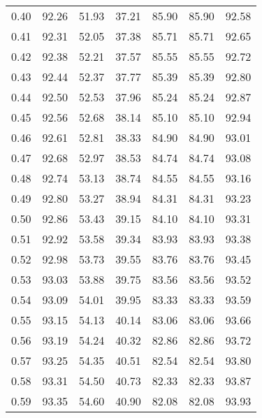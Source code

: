 \begin{tabular}{|c|c|c|c|c|c|c|}
      0.40 &     92.26 &     51.93 &      37.21 &   85.90 &      85.90 &         92.58 \\
      0.41 &     92.31 &     52.05 &      37.38 &   85.71 &      85.71 &         92.65 \\
      0.42 &     92.38 &     52.21 &      37.57 &   85.55 &      85.55 &         92.72 \\
      0.43 &     92.44 &     52.37 &      37.77 &   85.39 &      85.39 &         92.80 \\
      0.44 &     92.50 &     52.53 &      37.96 &   85.24 &      85.24 &         92.87 \\
      0.45 &     92.56 &     52.68 &      38.14 &   85.10 &      85.10 &         92.94 \\
      0.46 &     92.61 &     52.81 &      38.33 &   84.90 &      84.90 &         93.01 \\
      0.47 &     92.68 &     52.97 &      38.53 &   84.74 &      84.74 &         93.08 \\
      0.48 &     92.74 &     53.13 &      38.74 &   84.55 &      84.55 &         93.16 \\
      0.49 &     92.80 &     53.27 &      38.94 &   84.31 &      84.31 &         93.23 \\
      0.50 &     92.86 &     53.43 &      39.15 &   84.10 &      84.10 &         93.31 \\
      0.51 &     92.92 &     53.58 &      39.34 &   83.93 &      83.93 &         93.38 \\
      0.52 &     92.98 &     53.73 &      39.55 &   83.76 &      83.76 &         93.45 \\
      0.53 &     93.03 &     53.88 &      39.75 &   83.56 &      83.56 &         93.52 \\
      0.54 &     93.09 &     54.01 &      39.95 &   83.33 &      83.33 &         93.59 \\
      0.55 &     93.15 &     54.13 &      40.14 &   83.06 &      83.06 &         93.66 \\
      0.56 &     93.19 &     54.24 &      40.32 &   82.86 &      82.86 &         93.72 \\
      0.57 &     93.25 &     54.35 &      40.51 &   82.54 &      82.54 &         93.80 \\
      0.58 &     93.31 &     54.50 &      40.73 &   82.33 &      82.33 &         93.87 \\
      0.59 &     93.35 &     54.60 &      40.90 &   82.08 &      82.08 &         93.93 \\

\end{tabular}
